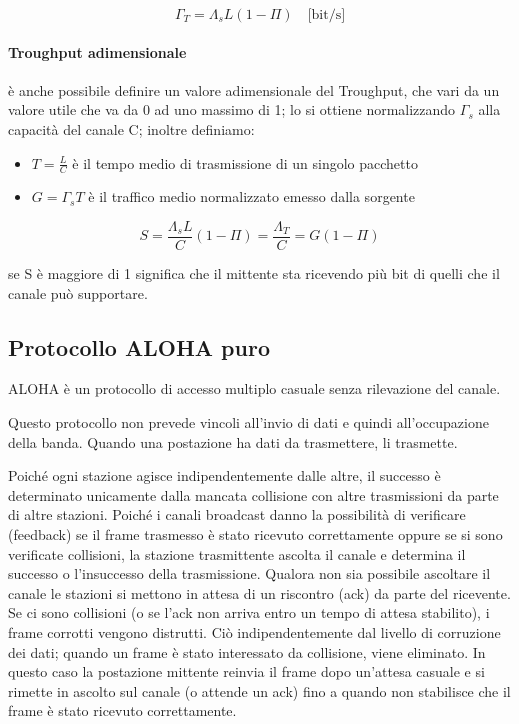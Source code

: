 \begin{equation}
    \Gamma_T = \Lambda_s L (1 - \Pi) \quad \text{[bit/s]}
\end{equation}
\paragraph{Troughput adimensionale}
è anche possibile definire un valore adimensionale del Troughput, che vari da un valore utile che va da 0 ad uno massimo di 1; lo si ottiene normalizzando $\Gamma_s$ alla capacità del canale C; inoltre definiamo:
\begin{itemize}
    \item $T = \frac{L}{C}$ è il tempo medio di trasmissione di un singolo pacchetto
    \item $G = \Gamma_sT$ è il traffico medio normalizzato emesso dalla sorgente
\end{itemize}


\begin{equation}
    S = \frac{\Lambda_s L}{C}(1 - \Pi) = \frac{\Lambda_T}{C} = G(1 - \Pi)
\end{equation}

se S è maggiore di 1 significa che il mittente sta ricevendo più bit di quelli che il canale può supportare.

\newpage

\subsection{Protocollo ALOHA puro}
ALOHA è un protocollo di accesso multiplo casuale senza rilevazione del canale.

Questo protocollo non prevede vincoli all'invio di dati e quindi all'occupazione della banda. Quando una postazione ha dati da trasmettere, li trasmette.

Poiché ogni stazione agisce indipendentemente dalle altre, il successo è determinato unicamente dalla mancata collisione con altre trasmissioni da parte di altre stazioni. Poiché i canali broadcast danno la possibilità di verificare (feedback) se il frame trasmesso è stato ricevuto correttamente oppure se si sono verificate collisioni, la stazione trasmittente ascolta il canale e determina il successo o l'insuccesso della trasmissione. Qualora non sia possibile ascoltare il canale le stazioni si mettono in attesa di un riscontro (ack) da parte del ricevente. Se ci sono collisioni (o se l'ack non arriva entro un tempo di attesa stabilito), i frame corrotti vengono distrutti. Ciò indipendentemente dal livello di corruzione dei dati; quando un frame è stato interessato da collisione, viene eliminato. In questo caso la postazione mittente reinvia il frame dopo un'attesa casuale e si rimette in ascolto sul canale (o attende un ack) fino a quando non stabilisce che il frame è stato ricevuto correttamente.
